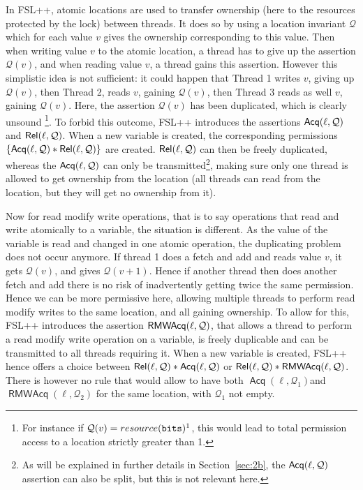 In FSL++, atomic locations are used to transfer ownership (here to the resources protected by the lock) between threads. It does so by using a location invariant $\mathcal{Q}$ which for each value $v$ gives the ownership corresponding to this value. Then when writing value $v$ to the atomic location, a thread has to give up the assertion $\mathcal{Q}(v)$, and when reading value $v$, a thread gains this assertion. However this simplistic idea is not sufficient: it could happen that Thread 1 writes $v$, giving up $\mathcal{Q}(v)$, then Thread 2, reads $v$, gaining $\mathcal{Q}(v)$, then Thread 3 reads as well $v$, gaining $\mathcal{Q}(v)$. Here, the assertion $\mathcal{Q}(v)$ has been duplicated, which is clearly unsound \footnote{For instance if $\mathcal{Q}(v) = resource(\texttt{bits})^{1}$, this would lead to total permission access to a location strictly greater than 1.}. To forbid this outcome, FSL++ introduces the assertions $\operatorname{\mathsf{Acq}}(\ell, \mathcal{Q})$ and $\operatorname{\mathsf{Rel}}(\ell, \mathcal{Q})$. When a new variable is created, the corresponding permissions $\{\operatorname{\mathsf{Acq}}(\ell, \mathcal{Q}) * \operatorname{\mathsf{Rel}}(\ell, \mathcal{Q})\}$ are created. $\operatorname{\mathsf{Rel}}(\ell, \mathcal{Q})$ can then be freely duplicated, whereas the $\operatorname{\mathsf{Acq}}(\ell, \mathcal{Q})$ can only be transmitted\footnote{As will be explained in further details in Section~\ref{sec:2b}, the $\operatorname{\mathsf{Acq}}(\ell, \mathcal{Q})$ assertion can also be split, but this is not relevant here.}, making sure only one thread is allowed to get ownership from the location (all threads can read from the location, but they will get no ownership from it). 

Now for read modify write operations, that is to say operations that read and write atomically to a variable, the situation is different. As the value of the variable is read and changed in one atomic operation, the duplicating problem does not occur anymore. If thread 1 does a fetch and add and reads value $v$, it gets $\mathcal{Q}(v)$, and gives $\mathcal{Q}(v + 1)$. Hence if another thread then does another fetch and add there is no risk of inadvertently getting twice the same permission. Hence we can be more permissive here, allowing multiple threads to perform read modify writes to the same location, and all gaining ownership. To allow for this, FSL++ introduces the assertion $\operatorname{\mathsf{RMWAcq}}(\ell, \mathcal{Q})$, that allows a thread to perform a read modify write operation on a variable,  is freely duplicable and can be transmitted to all threads requiring it. When a new variable is created, FSL++ hence offers a choice between $\operatorname{\mathsf{Rel}}(\ell, \mathcal{Q}) * \operatorname{\mathsf{Acq}}(\ell, \mathcal{Q})$ or $\operatorname{\mathsf{Rel}}(\ell, \mathcal{Q}) * \operatorname{\mathsf{RMWAcq}}(\ell, \mathcal{Q})$. There is however no rule that would allow to have both $\operatorname{\mathsf{Acq}}(\ell, \mathcal{Q}_1)$and $\operatorname{\mathsf{RMWAcq}}(\ell, \mathcal{Q}_2)$ for the same location, with $\mathcal{Q}_1$ not empty.

